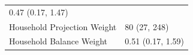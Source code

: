 \documentclass[]{article}
\newenvironment{Shaded}{\begin{snugshade}}{\end{snugshade}}
\newcommand{\DataTypeTok}[1]{\textcolor[rgb]{0.13,0.29,0.53}{#1}}
\newcommand{\DecValTok}[1]{\textcolor[rgb]{0.00,0.00,0.81}{#1}}
\newcommand{\KeywordTok}[1]{\textcolor[rgb]{0.13,0.29,0.53}{\textbf{#1}}}
\newcommand{\NormalTok}[1]{#1}
\newcommand{\OperatorTok}[1]{\textcolor[rgb]{0.81,0.36,0.00}{\textbf{#1}}}
\newcommand{\StringTok}[1]{\textcolor[rgb]{0.31,0.60,0.02}{#1}}
\begin{document}
\begin{longtable}[]{@{}ll@{}}
\begin{minipage}[t]{0.23\columnwidth}
0.47 (0.17, 1.47)\strut
\end{minipage}\tabularnewline
\begin{minipage}[t]{0.71\columnwidth}\raggedright
Household Projection Weight\strut
\end{minipage} & \begin{minipage}[t]{0.23\columnwidth}\raggedright
80 (27, 248)\strut
\end{minipage}\tabularnewline
\begin{minipage}[t]{0.71\columnwidth}\raggedright
Household Balance Weight\strut
\end{minipage} & \begin{minipage}[t]{0.23\columnwidth}\raggedright
0.51 (0.17, 1.59)\strut
\end{minipage}\tabularnewline
\bottomrule
\end{longtable}

\begin{Shaded}
\end{Shaded}
\end{document}
